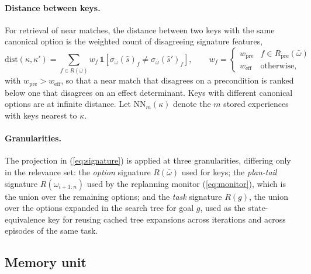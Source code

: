 \documentclass[11pt]{article}
\newcommand{\Rel}{R}
\newcommand{\shat}{\hat{s}}
\newcommand{\dist}{\mathrm{dist}}
\begin{document}
\paragraph{Distance between keys.}
For retrieval of near matches, the distance between two keys with the same canonical option is the weighted count of disagreeing signature features,
\begin{equation}
\dist(\kappa,\kappa')=\textstyle\sum_{f\in\Rel(\bar\omega)}w_f\,\mathbb{1}[\sigma_{\bar\omega}(\shat)_f\ne\sigma_{\bar\omega}(\shat')_f],
\qquad w_f=\begin{cases}w_{\mathrm{pre}} & f\in\Rel_{\mathrm{pre}}(\bar\omega)\\ w_{\mathrm{eff}} & \text{otherwise},\end{cases}
\label{eq:key-dist}
\end{equation}
with $w_{\mathrm{pre}}>w_{\mathrm{eff}}$, so that a near match that disagrees on a precondition is ranked below one that disagrees on an effect determinant. Keys with different canonical options are at infinite distance. Let $\mathrm{NN}_m(\kappa)$ denote the $m$ stored experiences with keys nearest to $\kappa$.

\paragraph{Granularities.}
The projection in (\ref{eq:signature}) is applied at three granularities, differing only in the relevance set: the \emph{option} signature $\Rel(\bar\omega)$ used for keys; the \emph{plan-tail} signature $\Rel(\omega_{i+1:n})$ used by the replanning monitor (\ref{eq:monitor}), which is the union over the remaining options; and the \emph{task} signature $\Rel(g)$, the union over the options expanded in the search tree for goal $g$, used as the state-equivalence key for reusing cached tree expansions across iterations and across episodes of the same task.

\subsection{Memory unit}
\label{sec:type2-unit}
\end{document}
